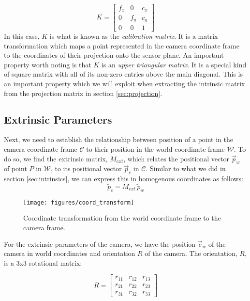 \begin{equation}
    K =
    \begin{bmatrix}
        f_x & 0   & c_x \\
        0   & f_y & c_y \\
        0   & 0   & 1
    \end{bmatrix}
\end{equation}
In this case, $K$ is what is known as the \emph{calibration matrix}. It is a matrix transformation which maps a point represented in the camera coordinate frame to the coordinates of their projection onto the sensor plane. An important property worth noting is that $K$ is an \emph{upper triangular matrix}. It is a special kind of square matrix with all of its non-zero entries above the main diagonal. This is an important property which we will exploit when extracting the intrinsic matrix from the projection matrix in section \ref{sec:projection}.

\subsection{Extrinsic Parameters} \label{sec:extrinsics}

Next, we need to establish the relationship between position of a point in the camera coordinate frame $\mathcal{C}$ to their position in the world coordinate frame $\mathcal{W}$. To do so, we find the extrinsic matrix, $M_{ext}$, which relates the positional vector $\vec{p}_w$ of point $P$ in $\mathcal{W}$, to its positional vector $\vec{p}_c$ in $\mathcal{C}$. Similar to what we did in section \ref{sec:intrinsics}, we can express this in homogenous coordinates as follows:
\begin{equation} \label{eq:pc}
    \widetilde{p}_c =  M_{ext}\,\widetilde{p}_w
\end{equation}

\begin{figure}[H]
    \centering
    \texttt{[image: figures/coord\_transform]}
    \caption{Coordinate transformation from the world coordinate frame to the camera frame.}
\end{figure}


For the extrinsic parameters of the camera, we have the position $\vec{c}_w$ of the camera in world coordinates and orientation $R$ of the camera. The orientation, $R$, is a 3x3 rotational matrix:

\begin{equation}
    R =
    \begin{bmatrix}
        r_{11} & r_{12} & r_{13} \\
        r_{21} & r_{22} & r_{23} \\
        r_{31} & r_{32} & r_{33}
    \end{bmatrix}
\end{equation}

